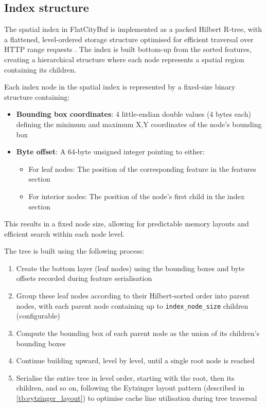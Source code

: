 \subsection{Index structure}
\label{methodology:spatial_index:index_structure}

The spatial index in FlatCityBuf is implemented as a packed Hilbert R-tree, with a flattened, level-ordered storage structure optimised for efficient traversal over HTTP range requests \citep{horance_2022_detail}. The index is built bottom-up from the sorted features, creating a hierarchical structure where each node represents a spatial region containing its children.

Each index node in the spatial index is represented by a fixed-size binary structure containing:

\begin{itemize}
  \item \textbf{Bounding box coordinates}: 4 little-endian double values (4 bytes each) defining the minimum and maximum X,Y coordinates of the node's bounding box
  \item \textbf{Byte offset}: A 64-byte unsigned integer pointing to either:
    \begin{itemize}
      \item For leaf nodes: The position of the corresponding feature in the features section
      \item For interior nodes: The position of the node's first child in the index section
    \end{itemize}
\end{itemize}

This results in a fixed node size, allowing for predictable memory layouts and efficient search within each node level.

The tree is built using the following process:

\begin{enumerate}
  \item Create the bottom layer (leaf nodes) using the bounding boxes and byte offsets recorded during feature serialisation
  \item Group these leaf nodes according to their Hilbert-sorted order into parent nodes, with each parent node containing up to \texttt{index\_node\_size} children (configurable)
  \item Compute the bounding box of each parent node as the union of its children's bounding boxes
  \item Continue building upward, level by level, until a single root node is reached
  \item Serialise the entire tree in level order, starting with the root, then its children, and so on, following the Eytzinger layout pattern (described in \autoref{tb:eytzinger_layout}) to optimise cache line utilisation during tree traversal
\end{enumerate}

